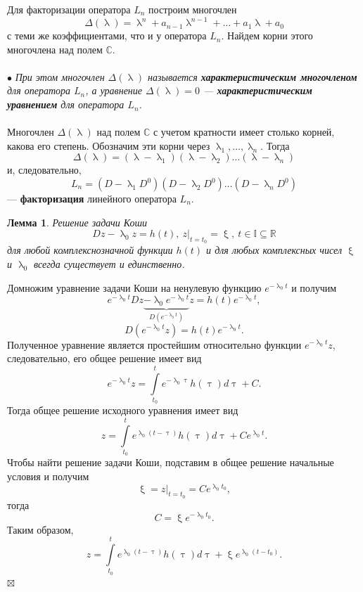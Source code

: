 \documentclass[a4paper, 12pt]{report}
\newenvironment{Proof} %
{\par\noindent{$\blacklozenge$}} %
{\hfill$\scriptstyle\boxtimes$}
\renewcommand{\lambda}{\uplambda}
\renewcommand{\xi}{\upxi}
\begin{document}
	Для факторизации оператора $L_n$ построим многочлен $$\Delta(\lambda) = \lambda^n+a_{n-1}\lambda^{n-1} + \ldots + a_1\lambda + a_0$$ с теми же коэффициентами, что и у оператора $L_n$. Найдем корни этого многочлена над полем $\mathbb{C}$.\\\\
	$\bullet$ \textit{При этом многочлен $\Delta(\lambda)$ называется \textbf{характеристическим многочленом} для оператора $L_n$, а уравнение $\Delta(\lambda) = 0$ --- \textbf{характеристическим уравнением} для оператора $L_n$.}\\\\
	Многочлен $\Delta(\lambda)$ над полем $\mathbb{C}$ с учетом кратности имеет столько корней, какова его степень. Обозначим эти корни через $\lambda_1,\ldots, \lambda_n$. Тогда $$\Delta(\lambda) = (\lambda - \lambda_1)(\lambda-\lambda_2)\ldots(\lambda - \lambda_n)$$ и, следовательно, $$L_n = (D-\lambda_1D^0)(D-\lambda_2D^0)\ldots(D-\lambda_nD^0)$$ --- \textbf{факторизация} линейного оператора $L_n$.
	\newtheorem*{2_1_1}{Лемма}\begin{2_1_1}Решение задачи Коши $$Dz - \lambda_0z = h(t),\ z|_{t=t_0} = \xi,\ t\in\mathbb{I}\subseteq\mathbb{R}$$ для любой комплекснозначной функции $h(t)$ и для любых комплексных чисел $\xi$ и $\lambda_0$ всегда существует и единственно.
	\end{2_1_1}\begin{Proof}
		Домножим уравнение задачи Коши на ненулевую функцию $e^{-\lambda_0t}$ и получим $$e^{-\lambda_0t}Dz \underbrace{ - \lambda_0 e^{-\lambda_0t}}_{D(e^{-\lambda_0t})}z = h(t) e^{-\lambda_0t},$$
		$$D(e^{-\lambda_0t}z)=h(t)e^{-\lambda_0t}.$$ Полученное уравнение является простейшим относительно функции $e^{-\lambda_0t}z$, следовательно, его общее решение имеет вид $$e^{-\lambda_0t}z = \int\limits_{t_0}^te^{-\lambda_0\uptau}h(\uptau)d\uptau + C.$$ Тогда общее решение исходного уравнения имеет вид $$z = \int\limits_{t_0}^te^{\lambda_0(t-\uptau)}h(\uptau)d\uptau + Ce^{\lambda_0t}.$$ Чтобы найти решение задачи Коши, подставим в общее решение начальные условия и получим $$\xi = z|_{t=t_0} = Ce^{\lambda_0t_0},$$ тогда $$C = \xi e^{-\lambda_0t_0}.$$ Таким образом, $$z = \int\limits_{t_0}^te^{\lambda_0(t-\uptau)}h(\uptau)d\uptau + \xi e^{\lambda_0(t-t_0)}.$$
	\end{Proof}
\end{document}
